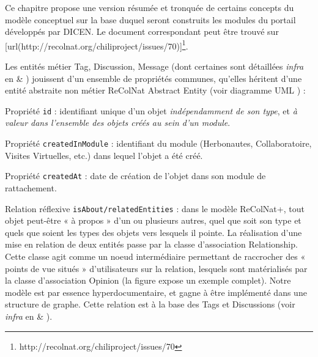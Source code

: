 \startchapter[title={Tags & Discussions}]

Ce chapitre propose une version résumée et tronquée de certains concepts du modèle conceptuel sur la base duquel seront construits les modules du portail développés par DICEN. Le document correspondant peut être trouvé sur [url(http://recolnat.org/chiliproject/issues/70)]\footnote{http://recolnat.org/chiliproject/issues/70}.

\startsection[title={Propriétés communes aux entités du modèle ReColNat+}]

Les entités métier Tag, Discussion, Message (dont certaines sont détaillées {\em infra} en  & ) jouissent d'un ensemble de propriétés communes, qu'elles héritent d'une entité abstraite non métier ReColNat Abstract Entity (voir diagramme UML ) :

\startitemize
\item Propriété {\tt id} : identifiant unique d'un objet {\em indépendamment de son type}, et {\em à valeur dans l'ensemble des objets créés au sein d'un module}.
\item Propriété {\tt createdInModule} : identifiant du module (Herbonautes, Collaboratoire, Visites Virtuelles, etc.) dans lequel l'objet a été créé. 
\item Propriété {\tt createdAt} : date de création de l'objet dans son module de rattachement.
\item Relation réflexive {\tt isAbout/relatedEntities} : dans le modèle ReColNat+, tout objet peut-être « à propos » d'un ou plusieurs autres, quel que soit son type et quels que soient les types des objets vers lesquels il pointe.
La réalisation d'une mise en relation de deux entités passe par la classe d'association Relationship.
Cette classe agit comme un noeud intermédiaire permettant de raccrocher des « points de vue situés » d'utilisateurs sur la relation, lesquels sont matérialisés par la classe d'association Opinion (la figure  expose un exemple complet).
Notre modèle est par essence hyperdocumentaire, et gagne à être implémenté dans une structure de graphe.
Cette relation est à la base des Tags et Discussions (voir {\em infra} en  & ).
\stopitemize

